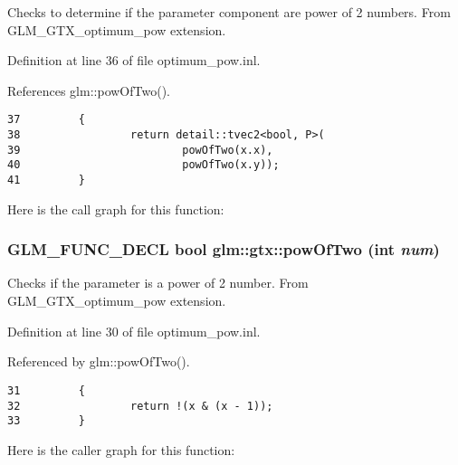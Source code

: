 Checks to determine if the parameter component are power of 2 numbers. From GLM\_\-GTX\_\-optimum\_\-pow extension. 

Definition at line 36 of file optimum\_\-pow.inl.

References glm::powOfTwo().

\begin{Code}\begin{verbatim}37         {
38                 return detail::tvec2<bool, P>(
39                         powOfTwo(x.x),
40                         powOfTwo(x.y));
41         }
\end{verbatim}
\end{Code}




Here is the call graph for this function:\hypertarget{group__gtx__optimum__pow_g399b24df28267c1f061c462dd359affd}{
\subsubsection[powOfTwo]{\setlength{\rightskip}{0pt plus 5cm}GLM\_\-FUNC\_\-DECL bool glm::gtx::powOfTwo (int {\em num})}}
\label{group__gtx__optimum__pow_g399b24df28267c1f061c462dd359affd}


Checks if the parameter is a power of 2 number. From GLM\_\-GTX\_\-optimum\_\-pow extension. 

Definition at line 30 of file optimum\_\-pow.inl.

Referenced by glm::powOfTwo().

\begin{Code}\begin{verbatim}31         {
32                 return !(x & (x - 1));
33         }
\end{verbatim}
\end{Code}




Here is the caller graph for this function: